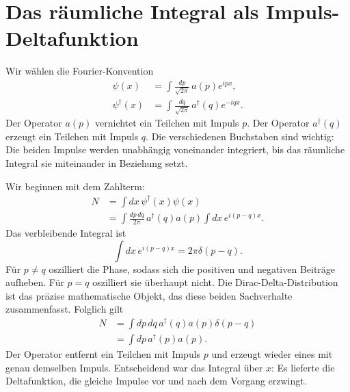 \section{Das räumliche Integral als Impuls-Deltafunktion}

Wir wählen die Fourier-Konvention
\begin{align}
\psi(x)&=\int\frac{dp}{\sqrt{2\pi}}\,a(p)e^{ipx},\\
\psi^\dagger(x)&=\int\frac{dq}{\sqrt{2\pi}}\,a^\dagger(q)e^{-iqx}.
\label{eq:l9-field-fourier}
\end{align}
Der Operator \(a(p)\) vernichtet ein Teilchen mit Impuls \(p\). Der Operator \(a^\dagger(q)\) erzeugt ein Teilchen mit Impuls \(q\). Die verschiedenen Buchstaben sind wichtig: Die beiden Impulse werden unabhängig voneinander integriert, bis das räumliche Integral sie miteinander in Beziehung setzt.

Wir beginnen mit dem Zahlterm:
\begin{align}
N
&=\int dx\,\psi^\dagger(x)\psi(x)\\
&=\int\frac{dp\,dq}{2\pi}\,
a^\dagger(q)a(p)
\int dx\,e^{i(p-q)x}.
\end{align}
Das verbleibende Integral ist
\begin{equation}
\int dx\,e^{i(p-q)x}=2\pi\delta(p-q).
\end{equation}
Für \(p\ne q\) oszilliert die Phase, sodass sich die positiven und negativen Beiträge aufheben. Für \(p=q\) oszilliert sie überhaupt nicht. Die Dirac-Delta-Distribution ist das präzise mathematische Objekt, das diese beiden Sachverhalte zusammenfasst. Folglich gilt
\begin{align}
N
&=\int dp\,dq\,a^\dagger(q)a(p)\delta(p-q)\\
&=\int dp\,a^\dagger(p)a(p).
\label{eq:l9-number-momentum}
\end{align}
Der Operator entfernt ein Teilchen mit Impuls \(p\) und erzeugt wieder eines mit genau demselben Impuls. Entscheidend war das Integral über \(x\): Es lieferte die Deltafunktion, die gleiche Impulse vor und nach dem Vorgang erzwingt.

\begin{classroomqa}\end{classroomqa}

